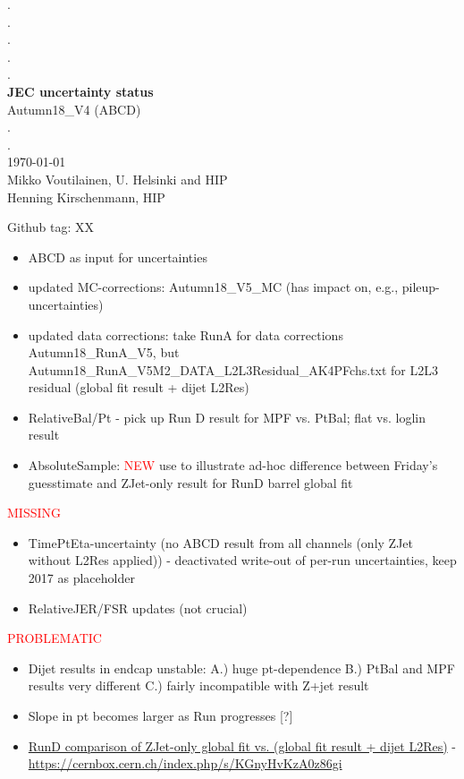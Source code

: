 \documentclass[landscape,10pt]{beamer} %
\begin{document}
\begin{centering}
{. }\\
{. }\\
{. }\\
{. }\\
{. }\\
{\bf JEC uncertainty status}\\
Autumn18\_V4 (ABCD)\\
.\\
.\\
\today\\
Mikko Voutilainen, U. Helsinki and HIP\\
Henning Kirschenmann, HIP\\
\end{centering}

\newpage

Github tag: XX

\begin{itemize}
\item ABCD as input for uncertainties
\item updated MC-corrections: Autumn18\_V5\_MC (has impact on, e.g., pileup-uncertainties)
\item updated data corrections: take RunA for data corrections Autumn18\_RunA\_V5, but Autumn18\_RunA\_V5M2\_DATA\_L2L3Residual\_AK4PFchs.txt for L2L3 residual (global fit result + dijet L2Res)
\item RelativeBal/Pt - pick up Run D result for MPF vs. PtBal; flat vs. loglin result
\item AbsoluteSample: \textcolor{red}{NEW} use to illustrate ad-hoc difference between Friday's guesstimate and ZJet-only result for RunD barrel global fit
\end{itemize}
\textcolor{red}{MISSING}
\begin{itemize}
\item TimePtEta-uncertainty (no ABCD result from all channels (only ZJet without L2Res applied)) - deactivated write-out of per-run uncertainties, keep 2017 as placeholder
\item RelativeJER/FSR updates (not crucial)
\end{itemize}
\newpage
\textcolor{red}{PROBLEMATIC}
\begin{itemize}
  \item Dijet results in endcap unstable: A.) huge pt-dependence B.) PtBal and MPF results very different C.) fairly incompatible with Z+jet result
  \item Slope in pt becomes larger as Run progresses [?]
  \item \textcolor{blue}{\href{https://cernbox.cern.ch/index.php/s/KGnyHvKzA0z86gi}{RunD comparison of ZJet-only global fit vs. (global fit result + dijet L2Res)}} - \href{https://cernbox.cern.ch/index.php/s/KGnyHvKzA0z86gi}{https://cernbox.cern.ch/index.php/s/KGnyHvKzA0z86gi}
\end{itemize}
\end{document}

